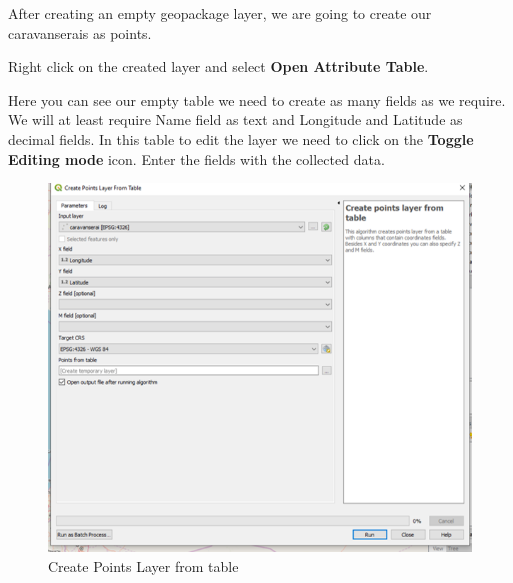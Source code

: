 \documentclass[
]{book}
\begin{document}
After creating an empty geopackage layer, we are going to create our caravanserais as points.

Right click on the created layer and select \textbf{Open Attribute Table}.

Here you can see our empty table we need to create as many fields as we require. We will at least require Name field as text and Longitude and Latitude as decimal fields. In this table to edit the layer we need to click on the \textbf{Toggle Editing mode} icon. Enter the fields with the collected data.

\begin{figure}
\centering
\includegraphics{Images/createpoints.png}
\caption{Create Points Layer from table}
\end{figure}

  
\end{document}
